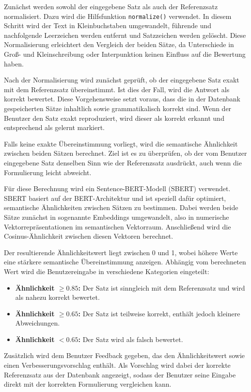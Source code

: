 Zunächst werden sowohl der eingegebene Satz als auch der Referenzsatz normalisiert. 
Dazu wird die Hilfsfunktion \texttt{normalize()} verwendet. 
In diesem Schritt wird der Text in Kleinbuchstaben umgewandelt, führende und nachfolgende Leerzeichen werden entfernt und Satzzeichen werden gelöscht. 
Diese Normalisierung erleichtert den Vergleich der beiden Sätze, da Unterschiede in Groß- und Kleinschreibung oder Interpunktion keinen Einfluss auf die Bewertung haben.

Nach der Normalisierung wird zunächst geprüft, ob der eingegebene Satz exakt mit dem Referenzsatz übereinstimmt. 
Ist dies der Fall, wird die Antwort als korrekt bewertet. 
Diese Vorgehensweise setzt voraus, dass die in der Datenbank gespeicherten Sätze inhaltlich sowie grammatikalisch korrekt sind. 
Wenn der Benutzer den Satz exakt reproduziert, wird dieser als korrekt erkannt und entsprechend als gelernt markiert.

Falls keine exakte Übereinstimmung vorliegt, wird die semantische Ähnlichkeit zwischen beiden Sätzen berechnet. 
Ziel ist es zu überprüfen, ob der vom Benutzer eingegebene Satz denselben Sinn wie der Referenzsatz ausdrückt, auch wenn die Formulierung leicht abweicht.

Für diese Berechnung wird ein Sentence-BERT-Modell (SBERT) verwendet. 
SBERT basiert auf der BERT-Architektur und ist speziell dafür optimiert, semantische Ähnlichkeiten zwischen Sätzen zu bestimmen. 
Dabei werden beide Sätze zunächst in sogenannte Embeddings umgewandelt, also in numerische Vektorrepräsentationen im semantischen Vektorraum. 
Anschließend wird die Cosinus-Ähnlichkeit zwischen diesen Vektoren berechnet.

Der resultierende Ähnlichkeitswert liegt zwischen 0 und 1, wobei höhere Werte eine stärkere semantische Übereinstimmung anzeigen. 
Abhängig vom berechneten Wert wird die Benutzereingabe in verschiedene Kategorien eingeteilt:

\begin{itemize}
\item \textbf{Ähnlichkeit $\geq 0.85$:} Der Satz ist sinngleich mit dem Referenzsatz und wird als nahezu korrekt bewertet.
\item \textbf{Ähnlichkeit $\geq 0.65$:} Der Satz ist teilweise korrekt, enthält jedoch kleinere Abweichungen.
\item \textbf{Ähnlichkeit $< 0.65$:} Der Satz wird als falsch bewertet.
\end{itemize}

Zusätzlich wird dem Benutzer Feedback gegeben, das den Ähnlichkeitswert sowie einen Verbesserungsvorschlag enthält. 
Als Vorschlag wird dabei der korrekte Referenzsatz aus der Datenbank angezeigt, sodass der Benutzer seine Eingabe direkt mit der korrekten Formulierung vergleichen kann.

